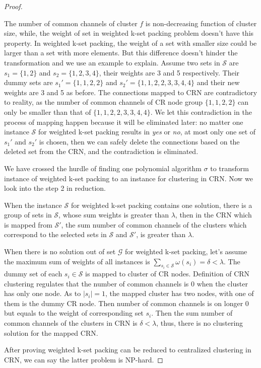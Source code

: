 \begin{proof}
\begin{itemize}
The number of common channels of cluster $f$ is non-decreasing function of cluster size, while, the weight of set in weighted k-set packing problem doesn't have this property.
In weighted k-set packing, the weight of a set with smaller size could be larger than a set with more elements.
But this difference doesn't hinder the transformation and we use an example to explain.
Assume two sets in $\mathcal{S}$ are $s_1=\{1,2\}$ and $s_2=\{1,2,3,4\}$, their weights are 3 and 5 respectively.
Their dummy sets are $s_1'=\{1,1,2,2\}$ and $s_2'=\{1,1,2,2,3,3,4,4\}$ and their new weights are 3 and 5 as before.
The connections mapped to CRN are contradictory to reality, as the number of common channels of CR node group $\{1,1,2,2\}$ can only be smaller than that of $\{1,1,2,2,3,3,4,4\}$.
We let this contradiction in the process of mapping happen because it will be eliminated later: no matter one instance $\mathcal{S}$ for weighted k-set packing results in \textit{yes} or \textit{no}, at most only one set of $s_1'$ and $s_2'$ is chosen, then we can safely delete the connections based on the deleted set from the CRN, and the contradiction is eliminated.
\end{itemize}






We have crossed the hurdle of finding one polynomial algorithm $\sigma$ to transform instance of weighted k-set packing to an instance for clustering in CRN.
Now we look into the step 2 in reduction.

When the instance $\mathcal{S}$ for weighted k-set packing contains one solution, \ie there is a group of sets in $\mathcal{S}$, whose sum weights is greater than $\lambda$, then in the CRN which is mapped from $\mathcal{S}'$, the sum number of common channels of the clusters which correspond to the selected sets in $\mathcal{S}$ and $\mathcal{S}'$, is greater than $\lambda$.

When there is no solution out of set $\mathcal{G}$ for weighted k-set packing, let's assume the maximum sum of weights of all instances is $\sum_{s_i\in \mathcal{S}}\omega(s_i)=\delta < \lambda$. 
The dummy set of each $s_i\in \mathcal{S}$ is mapped to cluster of CR nodes.
Definition of CRN clustering regulates that the number of common channels is 0 when the cluster has only one node.
As to $|s_i|=1$, the mapped cluster has two nodes, with one of them is the dummy CR node.
Then number of common channels is on longer 0 but equals to the weight of corresponding set $s_i$.
Then the sum number of common channels of the clusters in CRN is $\delta < \lambda$, thus, there is no clustering solution for the mapped CRN.

After proving weighted k-set packing can be reduced to centralized clustering in CRN, we can say the latter problem is NP-hard.
\end{proof}


